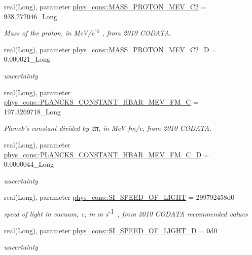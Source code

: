 \begin{DoxyCompactItemize}
real(Long), parameter \hyperlink{namespacephys__cons_a3460d18828c87b266ab35b1cdeb4a0a5}{phys\_\-cons::MASS\_\-PROTON\_\-MEV\_\-C2} = 938.272046\_\-Long
\begin{DoxyCompactList}\small\item\em Mass of the proton, in MeV/c$^{\mbox{$^\wedge$2}}$ , from 2010 CODATA. \item\end{DoxyCompactList}\item 
real(Long), parameter \hyperlink{namespacephys__cons_a3299e2ce8c6c720ed740eff7968b27a8}{phys\_\-cons::MASS\_\-PROTON\_\-MEV\_\-C2\_\-D} = 0.000021\_\-Long
\begin{DoxyCompactList}\small\item\em uncertainty \item\end{DoxyCompactList}\item 
real(Long), parameter \hyperlink{namespacephys__cons_aed64b5904d4665ea8272a82b187b78c9}{phys\_\-cons::PLANCKS\_\-CONSTANT\_\-HBAR\_\-MEV\_\-FM\_\-C} = 197.3269718\_\-Long
\begin{DoxyCompactList}\small\item\em Planck's constant divided by 2π, in MeV fm/c, from 2010 CODATA. \item\end{DoxyCompactList}\item 
real(Long), parameter \hyperlink{namespacephys__cons_a62594785e48a010b70b6d8320dc50269}{phys\_\-cons::PLANCKS\_\-CONSTANT\_\-HBAR\_\-MEV\_\-FM\_\-C\_\-D} = 0.0000044\_\-Long
\begin{DoxyCompactList}\small\item\em uncertainty \item\end{DoxyCompactList}\item 
real(Long), parameter \hyperlink{namespacephys__cons_ae265fad966cfc841f9a073a52955d742}{phys\_\-cons::SI\_\-SPEED\_\-OF\_\-LIGHT} = 299792458d0
\begin{DoxyCompactList}\small\item\em speed of light in vacuum, c, in m s$^{\mbox{-\/1}}$ , from 2010 CODATA recommended values \item\end{DoxyCompactList}\item 
real(Long), parameter \hyperlink{namespacephys__cons_a5547546b06eb8853e52e304b25cc7596}{phys\_\-cons::SI\_\-SPEED\_\-OF\_\-LIGHT\_\-D} = 0d0
\begin{DoxyCompactList}\small\item\em uncertainty \item\end{DoxyCompactList}\item 

\end{DoxyCompactItemize}

